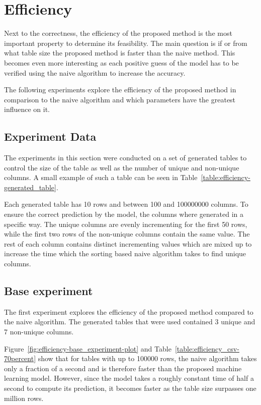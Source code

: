 \section{Efficiency}\label{sec:efficiency}
Next to the correctness, the efficiency of the proposed method is the most important property to determine its feasibility. The main question is if or from what table size the proposed method is faster than the naive method. This becomes even more interesting as each positive guess of the model has to be verified using the naive algorithm to increase the accuracy.

The following experiments explore the efficiency of the proposed method in comparison to the naive algorithm and which parameters have the greatest influence on it.


\subsection{Experiment Data}\label{subsec:efficiency-experiment_data}
The experiments in this section were conducted on a set of generated tables to control the size of the table as well as the number of unique and non-unique columns. A small example of such a table can be seen in Table~\ref{table:efficiency-generated_table}.

Each generated table has \num{10} rows and between \num{100} and \num{100000000} columns. To ensure the correct prediction by the model, the columns where generated in a specific way.
The unique columns are evenly incrementing for the first \num{50} rows, while the first two rows of the non-unique columns contain the same value. The rest of each column contains distinct incrementing values which are mixed up to increase the time which the sorting based naive algorithm takes to find unique columns.




\subsection{Base experiment}\label{subsec:efficiency-base_experiment}
The first experiment explores the efficiency of the proposed method compared to the naive algorithm. The generated tables that were used contained \num{3} unique and \num{7} non-unique columns.  %

Figure~\ref{fig:efficiency-base_experiment-plot} and Table~\ref{table:efficiency_csv-70percent} show that for tables with up to \num{100000} rows, the naive algorithm takes only a fraction of a second and is therefore faster than the proposed machine learning model. However, since the model takes a roughly constant time of half a second to compute its prediction, it becomes faster as the table size surpasses one million rows.

